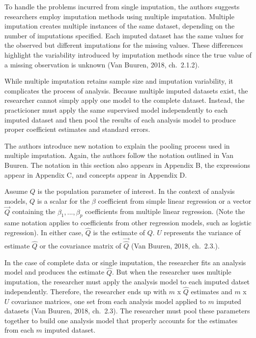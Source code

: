 \documentclass[12pt,oneside]{chicagocapstone}
\begin{document}
To handle the problems incurred from single imputation, the authors
suggests researchers employ imputation methods using multiple
imputation. Multiple imputation creates multiple instances of the same
dataset, depending on the number of imputations specified. Each imputed
dataset has the same values for the observed but different imputations
for the missing values. These differences highlight the variability
introduced by imputation methods since the true value of a missing
observation is unknown (Van Buuren, 2018, ch.~2.1.2).

While multiple imputation retains sample size and imputation
variability, it complicates the process of analysis. Because multiple
imputed datasets exist, the researcher cannot simply apply one model to
the complete dataset. Instead, the practicioner must apply the same
supervised model independently to each imputed dataset and then pool the
results of each analysis model to produce proper coefficient estimates
and standard errors.

The authors introduce new notation to explain the pooling process used
in multiple imputation. Again, the authors follow the notation outlined
in Van Buuren. The notation in this section also appears in Appendix B,
the expressions appear in Appendix C, and concepts appear in Appendix D.

Assume \(Q\) is the population parameter of interest. In the context of
analysis models, \(Q\) is a scalar for the \(\beta\) coefficient from
simple linear regression or a vector \(\vec{Q}\) containing the
\(\beta_1,...,\beta_p\) coefficients from multiple linear regression.
(Note the same notation applies to coefficients from other regression
models, such as logistic regression). In either case, \(\hat{Q}\) is the
estimate of \(Q\). \(U\) represents the variance of estimate \(\hat Q\)
or the covariance matrix of \(\vec{\hat Q}\) (Van Buuren, 2018,
ch.~2.3.).

In the case of complete data or single imputation, the researcher fits
an analysis model and produces the estimate \(\hat{Q}\). But when the
researcher uses multiple imputation, the researcher must apply the
analysis model to each imputed datset independently. Therefore, the
researcher ends up with \(m\) x \(\hat{Q}\) estimates and \(m\) x \(U\)
covariance matrices, one set from each analysis model applied to \(m\)
imputed datasets (Van Buuren, 2018, ch.~2.3). The researcher must pool
these parameters together to build one analysis model that properly
accounts for the estimates from each \(m\) imputed dataset.
\end{document}
